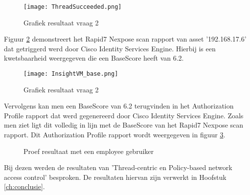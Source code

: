 \begin{figure}[H]
	\centering
	\texttt{[image: ThreadSucceeded.png]}
	\caption{Grafiek resultaat vraag 2}
	\label{fig:api}
\end{figure}

Figuur \ref{fig:rapid} demonstreert het Rapid7 Nexpose scan rapport van asset '192.168.17.6' dat getriggerd werd door Cisco Identity Services Engine. Hierbij is een kwetsbaarheid weergegeven die een Base\textunderscore Score heeft van 6.2.
\begin{figure}[H]
	\centering
	\texttt{[image: InsightVM\_base.png]}
	\caption{Grafiek resultaat vraag 2}
	\label{fig:rapid}
\end{figure}
Vervolgens kan men een Base\textunderscore Score van 6.2 terugvinden in het Authorization Profile rapport dat werd gegenereerd door Cisco Identity Services Engine. Zoals men ziet ligt dit volledig in lijn met de Base\textunderscore Score van het Rapid7 Nexpose scan rapport. Dit Authorization Profile rapport wordt weergegeven in figuur \ref{fig:detail}. 
\begin{figure}[H]
	\centering
	\qquad
	\caption{Proef resultaat met een employee gebruiker}%
	\label{fig:detail}%
\end{figure}

Bij dezen werden de resultaten van 'Thread-centric en Policy-based network access control' besproken. De resultaten hiervan zijn verwerkt in Hoofstuk \ref{ch:conclusie}.
